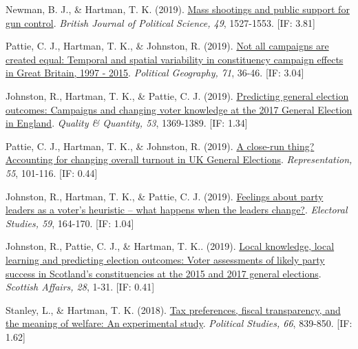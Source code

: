 \documentclass[12pt]{article}
\begin{document}
\begin{bibenum}
    \item *Newman, B. J., \& {Hartman, T. K.} (2019).
          \href{https://10.1017/S0007123417000333}
          {Mass shootings and public support for gun control}.
          \emph{British Journal of Political Science, 49}, 1527-1553. [IF: 3.81]
      
	\item Pattie, C. J., {Hartman, T. K.}, \& Johnston, R. (2019). 
	    \href{https://10.1016/j.polgeo.2019.02.010}
		{Not all campaigns are created equal: Temporal and spatial variability 
		in constituency campaign effects in Great Britain, 1997 - 2015}. 
	 	\emph{Political Geography, 71}, 36-46. [IF: 3.04]
	 	    
	\item Johnston, R., {Hartman, T. K.}, \& Pattie, C. J. (2019). 
		\href{https://10.1007/s11135-018-0819-1}
		{Predicting general election outcomes: Campaigns and changing voter 
		knowledge at the 2017 General Election in England}.
		\emph{Quality \& Quantity, 53}, 1369-1389. [IF: 1.34]
	 	    
    \item Pattie, C. J., {Hartman, T. K.}, \& Johnston, R. (2019).
    	\href{https://10.1080/00344893.2018.1555676}
    	{A close-run thing? Accounting for changing overall turnout in UK General Elections}.
    	\emph{Representation, 55}, 101-116. [IF: 0.44]

    \item Johnston, R., {Hartman, T. K.}, \& Pattie, C. J. (2019). 
    		\href{https://10.1016/j.electstud.2018.12.005}
    		{Feelings about party leaders as a voter's heuristic -- 
    		what happens when the leaders change?}.
        \emph{Electoral Studies, 59}, 164-170. [IF: 1.04]
          
	\item Johnston, R., Pattie, C. J., \& {Hartman, T. K.}. (2019). 
		\href{https://10.3366/scot.2019.0263}
		{Local knowledge, local learning and predicting election outcomes: 
		Voter assessments of likely party success in Scotland's constituencies 
		at the 2015 and 2017 general elections}.
		\emph{Scottish Affairs, 28}, 1-31. [IF: 0.41]
		
	\item *Stanley, L., \& {Hartman, T. K.} (2018).
          \href{https://10.1177/0032321717731661}
          {Tax preferences, fiscal transparency, and the meaning of welfare: 
          An experimental study}. 
          \emph{Political Studies, 66}, 839-850. [IF: 1.62]
          

\end{bibenum}
\end{document}
